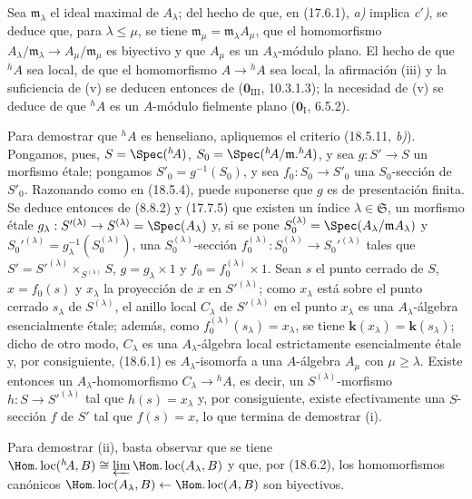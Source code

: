 
Sea $\mathfrak m_\lambda$ el ideal maximal de $A_\lambda$; del hecho de que, en (17.6.1), \emph{a)} implica \emph{c$'$)}, se deduce que, para $\lambda\leq\mu$, se tiene $\mathfrak m_\mu=\mathfrak m_\lambda A_\mu$, que el homomorfismo $A_\lambda/\mathfrak m_\lambda\to A_\mu/\mathfrak m_\mu$ es biyectivo y que $A_\mu$ es un $A_\lambda$-módulo plano. El hecho de que ${}^h\!A$ sea local, de que el homomorfismo $A\to{}^h\!A$ sea local, la afirmación (iii) y la suficiencia de (v) se deducen entonces de ($\mathbf{0}_{\mathrm{III}}$, 10.3.1.3); la necesidad de (v) se deduce de que ${}^h\!A$ es un $A$-módulo fielmente plano ($\mathbf{0}_{\mathrm I}$, 6.5.2).

Para demostrar que ${}^h\!A$ es henseliano, apliquemos el criterio (18.5.11, \emph{b)}). Pongamos, pues, $S=\Spec({}^h\!A)$, $S_0=\Spec({}^h\!A/\mathfrak m.{}^h\!A)$, y sea $g:S'\to S$ un morfismo étale; pongamos $S'_0=g^{-1}(S_0)$, y sea $f_0:S_0\to S'_0$ una $S_0$-sección de $S'_0$. Razonando como en (18.5.4), puede suponerse que $g$ es de presentación finita. Se deduce entonces de (8.8.2) y (17.7.5) que existen un índice $\lambda\in\mathfrak S$, un morfismo étale $g_\lambda:S'^{(\lambda)}\to S^{(\lambda)}=\Spec(A_\lambda)$ y, si se pone $S_0^{(\lambda)}=\Spec(A_\lambda/\mathfrak mA_\lambda)$ y $S_0'^{(\lambda)}=g_\lambda^{-1}(S_0^{(\lambda)})$, una $S_0^{(\lambda)}$-sección $f_0^{(\lambda)}:S_0^{(\lambda)}\to S_0'^{(\lambda)}$ tales que
$S'=S'^{(\lambda)}\times_{S^{(\lambda)}}S$, $g=g_\lambda\times1$ y $f_0=f_0^{(\lambda)}\times1$.
Sean $s$ el punto cerrado de $S$, $x=f_0(s)$ y $x_\lambda$ la proyección de $x$ en $S'^{(\lambda)}$; como $x_\lambda$ está sobre el punto cerrado $s_\lambda$ de $S^{(\lambda)}$, el anillo local $C_\lambda$ de $S'^{(\lambda)}$ en el punto $x_\lambda$ es una $A_\lambda$-álgebra esencialmente étale; además, como $f_0^{(\lambda)}(s_\lambda)=x_\lambda$, se tiene $\boldsymbol{k}(x_\lambda)=\boldsymbol{k}(s_\lambda)$; dicho de otro modo, $C_\lambda$ es una $A_\lambda$-álgebra local estrictamente esencialmente étale y, por consiguiente, (18.6.1) es $A_\lambda$-isomorfa a una $A$-álgebra $A_\mu$ con $\mu\geq\lambda$. Existe entonces un $A_\lambda$-homomorfismo $C_\lambda\to{}^h\!A$, es decir, un $S^{(\lambda)}$-morfismo $h:S\to S'^{(\lambda)}$ tal que $h(s)=x_\lambda$ y, por consiguiente, existe efectivamente una $S$-sección $f$ de $S'$ tal que $f(s)=x$, lo que termina de demostrar (i).

Para demostrar (ii), basta observar que se tiene
$\Hom.\operatorname{loc}({}^h\!A,B)\cong\varprojlim\Hom.\operatorname{loc}(A_\lambda,B)$
y que, por (18.6.2), los homomorfismos canónicos $\Hom.\operatorname{loc}(A_\lambda,B)\leftarrow\Hom.\operatorname{loc}(A,B)$ son biyectivos.

